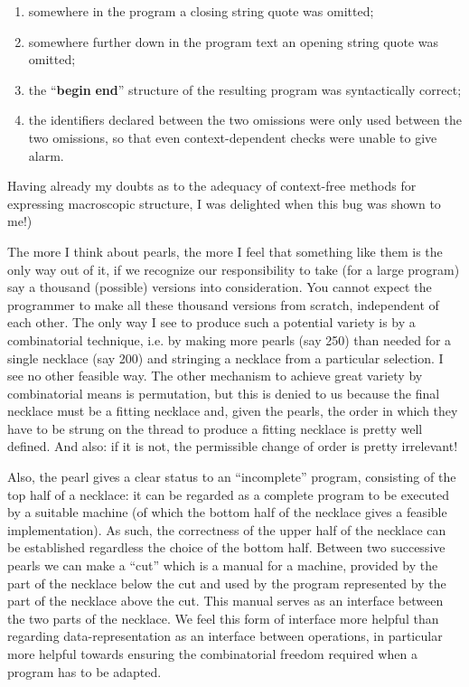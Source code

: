\documentclass[twoside,11pt]{book}
\begin{document}
\begin{enumerate}[wide, nosep, label=(\arabic*)]
	\item somewhere in the program a closing string quote was omitted;
	
	\item somewhere further down in the program text an opening string quote was omitted;
	
	\item the ``\textbf{begin} \textendash  \textbf{end}'' structure of the resulting program was syntactically correct;
	
	\item the identifiers declared between the two omissions were only used 	between the two omissions, so that even context-dependent checks were 	unable to give alarm.
\end{enumerate}

\noindent
Having already my doubts as to the adequacy of context-free methods for expressing macroscopic structure, I was delighted when this bug was shown to me!)

The more I think about pearls, the more I feel that something like them is the only way out of it, if we recognize our responsibility to take (for a large program) say a thousand (possible) versions into consideration. You cannot expect the programmer to make all these thousand versions from scratch, independent of each other. The only way I see to produce such a potential variety is by a combinatorial technique, i.e. by making more pearls (say 250) than needed for a single necklace (say 200) and stringing a necklace from a particular selection. I see no other feasible way. The other mechanism to achieve great variety by combinatorial means is permutation, but this is denied to us because the final necklace must be a fitting necklace and, given the pearls, the order in which they have to be strung on the thread to produce a fitting necklace is pretty well defined. And also: if it is not, the permissible change of order is pretty irrelevant!

Also, the pearl gives a clear status to an ``incomplete'' program, consisting of the top half of a necklace: it can be regarded as a complete program to be executed by a suitable machine (of which the bottom half of the necklace gives a feasible implementation). As such, the correctness of the upper half of the necklace can be established regardless the choice of the bottom half. Between two successive pearls we can make a ``cut'' which is a manual for a machine, provided by the part of the necklace below the cut and used by the program represented by the part of the necklace above the cut. This manual serves as an interface between the two parts of the necklace. We feel this form of interface more helpful than regarding data-representation as an interface between operations, in particular more helpful towards ensuring the combinatorial freedom required when a program has to be adapted.
\end{document}
